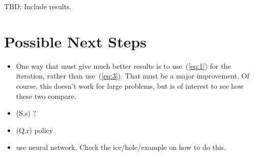 \documentclass{article}
\begin{document}
TBD: Include results.


\section{Possible Next Steps}
\label{sec:next-steps}


\begin{itemize}
\item One way that must give much better results is to use~(\ref{eq:1}) for the iteration, rather than use~(\ref{eq:3}). That must be a major improvement. Of course, this doesn't work for large problems, but is of interest to see how these two compare.
\item (S,s) ?
\item (Q,r) policy
\item use neural network. Check the ice/hole/example on how to do this. 
\end{itemize}
\end{document}
